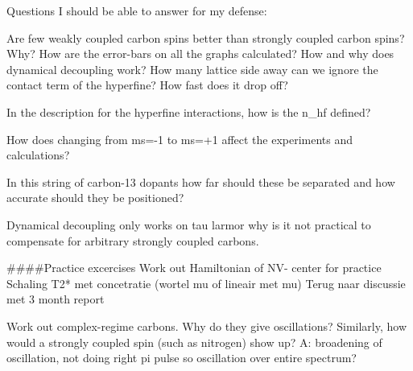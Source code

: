 Questions I should be able to answer for my defense:

Are few weakly coupled carbon spins better than strongly coupled carbon spins? Why?
How are the error-bars on all the graphs calculated?
How and why does dynamical decoupling work?
How many lattice side away can we ignore the contact term of the hyperfine? How fast does it drop off?

In the description for the hyperfine interactions, how is the n_hf defined?

How does changing from ms=-1 to ms=+1 affect the experiments and calculations?

In this string of carbon-13  dopants how far should these be separated and how accurate should they be positioned?

Dynamical decoupling only works on tau larmor
why is it not practical to compensate for arbitrary strongly coupled carbons.



####Practice excercises
Work out Hamiltonian of NV- center for practice
Schaling T2* met concetratie (wortel mu of lineair met mu) Terug naar discussie met 3 month report

Work out complex-regime carbons. Why do they give oscillations?
Similarly, how would a strongly coupled spin (such as nitrogen) show up? A: broadening of oscillation, not doing right pi pulse so oscillation over entire spectrum?
